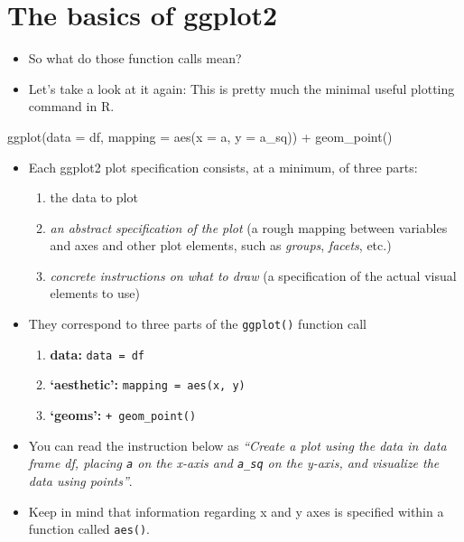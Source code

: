 \documentclass[
]{book}
\newenvironment{Shaded}{\begin{snugshade}}{\end{snugshade}}
\newcommand{\AttributeTok}[1]{\textcolor[rgb]{0.77,0.63,0.00}{#1}}
\newcommand{\FunctionTok}[1]{\textcolor[rgb]{0.00,0.00,0.00}{#1}}
\newcommand{\NormalTok}[1]{#1}
\newcommand{\SpecialCharTok}[1]{\textcolor[rgb]{0.00,0.00,0.00}{#1}}
\providecommand{\tightlist}{%
  \setlength{\itemsep}{0pt}\setlength{\parskip}{0pt}}
\begin{document}
\hypertarget{the-basics-of-ggplot2-1}{%
\section{The basics of ggplot2}\label{the-basics-of-ggplot2-1}}

\begin{itemize}
\item
  So what do those function calls mean?
\item
  Let's take a look at it again: This is pretty much the minimal useful plotting command in R.
\end{itemize}

\begin{Shaded}
\begin{Highlighting}[]
\FunctionTok{ggplot}\NormalTok{(}\AttributeTok{data =}\NormalTok{ df, }\AttributeTok{mapping =} \FunctionTok{aes}\NormalTok{(}\AttributeTok{x =}\NormalTok{ a, }\AttributeTok{y =}\NormalTok{ a\_sq)) }\SpecialCharTok{+} \FunctionTok{geom\_point}\NormalTok{()}
\end{Highlighting}
\end{Shaded}

\begin{itemize}
\tightlist
\item
  Each ggplot2 plot specification consists, at a minimum, of three parts:

  \begin{enumerate}
  \def\labelenumi{\arabic{enumi}.}
  \tightlist
  \item
    {the data to plot}
  \item
    {\emph{an abstract specification of the plot} (a rough mapping between variables and axes and other plot elements, such as \emph{groups}, \emph{facets}, etc.)}
  \item
    {\emph{concrete instructions on what to draw} (a specification of the actual visual elements to use)}
  \end{enumerate}
\item
  They correspond to three parts of the \texttt{ggplot()} function call

  \begin{enumerate}
  \def\labelenumi{\arabic{enumi}.}
  \tightlist
  \item
    {\textbf{data:} \texttt{data\ =\ df}}
  \item
    {\textbf{`aesthetic':} \texttt{mapping\ =\ aes(x,\ y)}}
  \item
    {\textbf{`geoms':} \texttt{+\ geom\_point()}}
  \end{enumerate}
\item
  You can read the instruction below as \emph{``Create a plot {using the data in data frame df}, {placing \texttt{a} on the x-axis and \texttt{a\_sq} on the y-axis}, {and visualize the data using points}''}.
\item
  Keep in mind that information regarding x and y axes is specified within a function called \texttt{aes()}.
\end{itemize}
\end{document}
